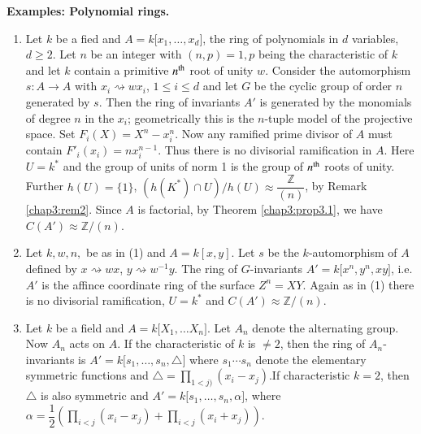 \medskip    
\noindent\textbf{Examples: Polynomial rings.}
\begin{enumerate}[1.]
\item Let $k$ be a fied and $A = k \big[x_1, \ldots , x_d \big]$, the
  ring of polynomials in $d$ variables, $d \ge 2$. Let $n$ be an
  integer with $(n, p) = 1, p$ being the characteristic of $k$ and
  let $k$ contain a  primitive $n^{\rm th}$ root of unity $w$. Consider the
  automorphism $s : A \to A$ with $x_i \rightsquigarrow w x_i$, $1 \le i
  \le d$ and let $G$ be the cyclic group of order $n$ generated by
  $s$. Then the ring of invariants $A'$ is generated by the monomials
  of degree $n$ in the $x_i$; geometrically this is the $n$-tuple model
  of the projective space. Set $F_i (X) = X^n - x^n_i$. Now any
  ramified prime divisor of $A$ must contain $F'_i (x_i) =
  nx^{n-1}_i$. Thus there is no divisorial ramification in $A$. Here
  $U = k^*$ and the group of units of norm 1 is the group of $n^{\rm th}$
  roots of unity. Further $h(U) = \{1\}$, $(h(K^*) \cap U) \big / h(U)
  \approx \dfrac{\mathbb{Z}}{(n)}$, by Remark \ref{chap3:rem2}. Since
  $A$ is factorial, by Theorem \ref{chap3:prop3.1}, we have
  $C(A') \approx \mathbb{Z}  / (n)$. 

\item Let $k, w, n,$ be as in (1) and $A = k [x, y]$. Let $s$ be the
  $k$-automorphism of $A$ defined by $x \rightsquigarrow wx$, $y
  \rightsquigarrow w^{-1}y$. The ring of $G$-invariants $A' = k \big[
    x^n, y^n, xy \big]$, i.e. $A'$ is the affince coordinate ring of
  the surface  $Z^n = XY$. Again as in (1) there is no divisorial
  ramification, $U = k^*$ and $C(A') \approx \mathbb{Z}/ (n)$. 

\item Let $k$ be a field and $A = k \big[X_1, \ldots X_n \big]$. Let
  $A_n$ denote the alternating group. Now $A_n$ acts on $A$. If the
  characteristic of $k$ is $\neq 2$, then the ring of $A_n$-invariants
  is $A' = k \big [s_1, \ldots , s_n, \triangle \big]$ where $s_1
  \cdots s_n$ denote the elementary symmetric functions and
  $\triangle = \prod\limits_{1 < j)} (x_i - x_j)$.\pageoriginale If
  characteristic 
  $k = 2$, then $\triangle$ is also symmetric and $A' = k \big[ s_1,
    \ldots , s_n, \alpha \big]$, where $\alpha = \dfrac{1}{2}
  (\prod\limits_{i < j} (x_i - x_j) + \prod\limits_{i < j} (x_i +
  x_j))$.
\end{enumerate}

